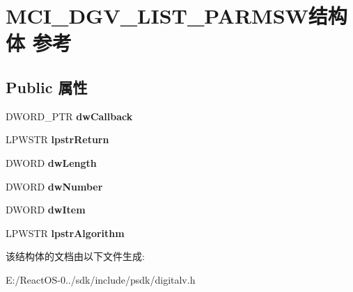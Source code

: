 \hypertarget{struct_m_c_i___d_g_v___l_i_s_t___p_a_r_m_s_w}{}\section{M\+C\+I\+\_\+\+D\+G\+V\+\_\+\+L\+I\+S\+T\+\_\+\+P\+A\+R\+M\+S\+W结构体 参考}
\label{struct_m_c_i___d_g_v___l_i_s_t___p_a_r_m_s_w}
\subsection*{Public 属性}
\begin{DoxyCompactItemize}
\item 
\mbox{\label{struct_m_c_i___d_g_v___l_i_s_t___p_a_r_m_s_w_a4c45864c6796d6c55578c4bc23e126c4}} 
D\+W\+O\+R\+D\+\_\+\+P\+TR {\bfseries dw\+Callback}
\item 
\mbox{\label{struct_m_c_i___d_g_v___l_i_s_t___p_a_r_m_s_w_ac9490f6dd9c9dbb633f22c4d792338da}} 
L\+P\+W\+S\+TR {\bfseries lpstr\+Return}
\item 
\mbox{\label{struct_m_c_i___d_g_v___l_i_s_t___p_a_r_m_s_w_a981497a13bb56c7068c576b94972d8d1}} 
D\+W\+O\+RD {\bfseries dw\+Length}
\item 
\mbox{\label{struct_m_c_i___d_g_v___l_i_s_t___p_a_r_m_s_w_a0ffa96799fe18c2997cef646f8a2de32}} 
D\+W\+O\+RD {\bfseries dw\+Number}
\item 
\mbox{\label{struct_m_c_i___d_g_v___l_i_s_t___p_a_r_m_s_w_aaa777d0488d590f1be94cc53fee30231}} 
D\+W\+O\+RD {\bfseries dw\+Item}
\item 
\mbox{\label{struct_m_c_i___d_g_v___l_i_s_t___p_a_r_m_s_w_a2437bca8b9f55878eafd9d29b66a5ed9}} 
L\+P\+W\+S\+TR {\bfseries lpstr\+Algorithm}
\end{DoxyCompactItemize}


该结构体的文档由以下文件生成\+:\begin{DoxyCompactItemize}
\item 
E\+:/\+React\+O\+S-\/0../sdk/include/psdk/digitalv.\+h\end{DoxyCompactItemize}
